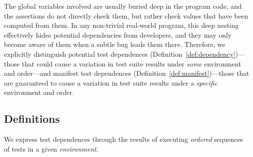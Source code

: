 The global variables involved are usually buried deep in
the program code, and the assertions do not directly check them,
but rather check values that have been computed from
them. In any non-trivial real-world program, this
deep nesting effectively hides potential dependencies from developers,
and they may only become aware of them when a subtle bug leads them
there.  Therefore, we explicitly
distinguish potential test dependences (Definition~\ref{def:dependency})---those that could cause a variation in test suite results 
under \emph{some} environment and order---and manifest test
dependences (Definition~\ref{def:manifest})---those that are guaranteed to cause a
variation in test suite results under a \emph{specific} environment and order.  









\subsection{Definitions}
\label{sec:definitions}

We express test dependences through the results of executing
\emph{ordered} sequences of tests in a given \emph{environment}.


